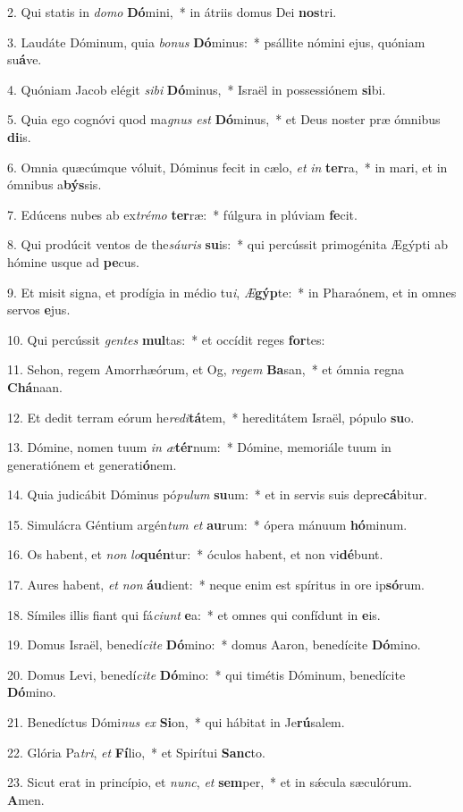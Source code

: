 2. Qui statis in \textit{do}\textit{mo} \textbf{Dó}mini,~*  in átriis domus Dei \textbf{nos}tri.\

3. Laudáte Dóminum, quia \textit{bo}\textit{nus} \textbf{Dó}minus:~*  psállite nómini ejus, quóniam su\textbf{á}ve.\

4. Quóniam Jacob elégit \textit{si}\textit{bi} \textbf{Dó}minus,~*  Israël in possessiónem \textbf{si}bi.\

5. Quia ego cognóvi quod ma\textit{gnus} \textit{est} \textbf{Dó}minus,~*  et Deus noster præ ómnibus \textbf{di}is.\

6. Omnia quæcúmque vóluit, Dóminus fecit in cælo, \textit{et} \textit{in} \textbf{ter}ra,~*  in mari, et in ómnibus a\textbf{býs}sis.\

7. Edúcens nubes ab ex\textit{tré}\textit{mo} \textbf{ter}ræ:~*  fúlgura in plúviam \textbf{fe}cit.\

8. Qui prodúcit ventos de the\textit{sáu}\textit{ris} \textbf{su}is:~*  qui percússit primogénita Ægýpti ab hómine usque ad \textbf{pe}cus.\

9. Et misit signa, et prodígia in médio tu\textit{i}, \textit{Æ}\textbf{gýp}te:~*  in Pharaónem, et in omnes servos \textbf{e}jus.\

10. Qui percússit \textit{gen}\textit{tes} \textbf{mul}tas:~*  et occídit reges \textbf{for}tes:\

11. Sehon, regem Amorrhæórum, et Og, \textit{re}\textit{gem} \textbf{Ba}san,~*  et ómnia regna \textbf{Chá}naan.\

12. Et dedit terram eórum he\textit{re}\textit{di}\textbf{tá}tem,~*  hereditátem Israël, pópulo \textbf{su}o.\

13. Dómine, nomen tuum \textit{in} \textit{æ}\textbf{tér}num:~*  Dómine, memoriále tuum in generatiónem et generati\textbf{ó}nem.\

14. Quia judicábit Dóminus pó\textit{pu}\textit{lum} \textbf{su}um:~*  et in servis suis depre\textbf{cá}bitur.\

15. Simulácra Géntium argén\textit{tum} \textit{et} \textbf{au}rum:~*  ópera mánuum \textbf{hó}minum.\

16. Os habent, et \textit{non} \textit{lo}\textbf{quén}tur:~*  óculos habent, et non vi\textbf{dé}bunt.\

17. Aures habent, \textit{et} \textit{non} \textbf{áu}dient:~*  neque enim est spíritus in ore ip\textbf{só}rum.\

18. Símiles illis fiant qui fá\textit{ci}\textit{unt} \textbf{e}a:~*  et omnes qui confídunt in \textbf{e}is.\

19. Domus Israël, benedí\textit{ci}\textit{te} \textbf{Dó}mino:~*  domus Aaron, benedícite \textbf{Dó}mino.\

20. Domus Levi, benedí\textit{ci}\textit{te} \textbf{Dó}mino:~*  qui timétis Dóminum, benedícite \textbf{Dó}mino.\

21. Benedíctus Dómi\textit{nus} \textit{ex} \textbf{Si}on,~*  qui hábitat in Je\textbf{rú}salem.\

22. Glória Pa\textit{tri}, \textit{et} \textbf{Fí}lio,~*  et Spirítui \textbf{Sanc}to.\

23. Sicut erat in princípio, et \textit{nunc}, \textit{et} \textbf{sem}per,~*  et in sǽcula sæculórum. \textbf{A}men.\

